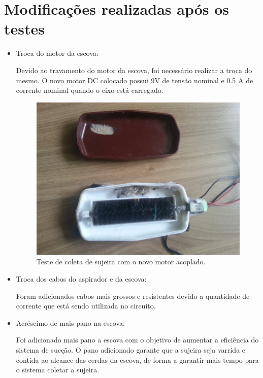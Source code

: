    \section{Modificações realizadas após os testes}
   \label{sub:mudanças}
   \begin{itemize}
      \item Troca do motor da escova:

         Devido ao travamento do motor da escova, foi necessário realizar a troca do mesmo. O novo motor DC colocado possui 9V de tensão nominal e 0.5 A de corrente nominal quando o eixo está carregado.

         \begin{figure}[H]
            \centering
            \includegraphics[scale=0.1]{figuras/SuccaoPC3_1.jpg}
            \caption{Teste de coleta de sujeira com o novo motor acoplado.}
            \label{img:teste_coleta}
         \end{figure}

      \item Troca dos cabos do aspirador e da escova:

         Foram adicionados cabos mais grossos e resistentes devido a quantidade de corrente que está sendo utilizada no circuito.

      \item Acréscimo de mais pano na escova:

         Foi adicionado mais pano a escova com o objetivo de aumentar a eficiência do sistema de sucção. O pano adicionado garante que a sujeira seja varrida e contida ao alcance das cerdas da escova, de forma a garantir mais tempo para o sistema coletar a sujeira.


\end{itemize}
